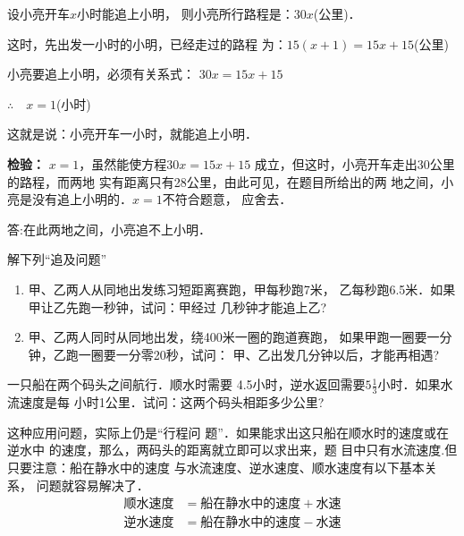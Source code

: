 \begin{solution}    
设小亮开车$x$小时能追上小明，
        则小亮所行路程是：$30x$(公里)．

    这时，先出发一小时的小明，已经走过的路程
为：$15(x+1)=15x + 15$(公里)

    小亮要追上小明，必须有关系式：
            $  30x=15x+15$

$\therefore\quad x= 1$(小时)

    这就是说：小亮开车一小时，就能追上小明．

\textbf{检验：} $x=1$，虽然能使方程$30x =15x + 15$
成立，但这时，小亮开车走出30公里的路程，而两地
实有距离只有28公里，由此可见，在题目所给出的两
地之间，小亮是没有追上小明的．$x=1$不符合题意，
应舍去．

    答:在此两地之间，小亮追不上小明．
\end{solution}


\begin{ex}
    解下列“追及问题”
\begin{enumerate}
    \item 甲、乙两人从同地出发练习短距离赛跑，甲每秒跑7米，
    乙每秒跑6.5米．如果甲让乙先跑一秒钟，试问：甲经过
    几秒钟才能追上乙?
    \item    甲、乙两人同时从同地出发，绕400米一圈的跑道赛跑，
    如果甲跑一圈要一分钟，乙跑一圈要一分零20秒，试问：
    甲、乙出发几分钟以后，才能再相遇?
\end{enumerate}  
\end{ex}



\begin{example}
一只船在两个码头之间航行．顺水时需要
4.5小时，逆水返回需要$5\frac{1}{3}$小时．如果水流速度是每
小时1公里．试问：这两个码头相距多少公里?
\end{example}

\begin{analyze}
    这种应用问题，实际上仍是“行程问
题”．如果能求出这只船在顺水时的速度或在逆水中
的速度，那么，两码头的距离就立即可以求出来，题
目中只有水流速度.但只要注意：船在静水中的速度
与水流速度、逆水速度、顺水速度有以下基本关系，
问题就容易解决了．
\[\begin{split}
    \text{顺水速度}&=\text{船在静水中的速度}+\text{水速}\\
    \text{逆水速度}&=\text{船在静水中的速度}-\text{水速}\\
\end{split}\]    
\end{analyze}

